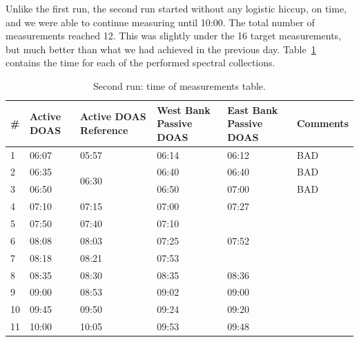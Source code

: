 Unlike the first run, the second run started without any logistic
hiccup, on time, and we were able to continue measuring until 10:00.
The total number of measurements reached 12. This was slightly under the
16 target measurements, but much better than what we had achieved in the
previous day. Table~\ref{tab:second_run_measurements} contains the time
for each of the performed spectral collections.

\begin{table}[htpb]
    \centering
    \caption{Second run: time of measurements table.}
    \label{tab:second_run_measurements}
    \begin{tabularx}{\textwidth}{@{}lXXXXl@{}}
        \toprule
        \textbf{\#} & \textbf{Active DOAS} & \textbf{Active DOAS Reference} & \textbf{West Bank Passive DOAS} & \textbf{East Bank Passive DOAS} & \textbf{Comments} \\ \midrule
        1           & 06:07                & 05:57                          & 06:14                           & 06:12                           & BAD               \\
        2           & 06:35                & \multirow{2}{*}{06:30}         & 06:40                           & 06:40                           & BAD               \\
        3           & 06:50                &                                & 06:50                           & 07:00                           & BAD               \\
        4           & 07:10                & 07:15                          & 07:00                           & 07:27                           &                   \\
        5           & 07:50                & 07:40                          & 07:10                           & \multirow{3}{*}{07:52}          &                   \\
        6           & 08:08                & 08:03                          & 07:25                           &                                 &                   \\
        7           & 08:18                & 08:21                          & 07:53                           &                                 &                   \\
        8           & 08:35                & 08:30                          & 08:35                           & 08:36                           &                   \\
        9           & 09:00                & 08:53                          & 09:02                           & 09:00                           &                   \\
        10          & 09:45                & 09:50                          & 09:24                           & 09:20                           &                   \\
        11          & 10:00                & 10:05                          & 09:53                           & 09:48                           &                   \\ \bottomrule
    \end{tabularx}
\end{table}

